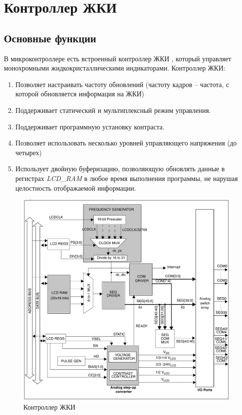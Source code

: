 \section{Контроллер ЖКИ}
\subsection{Основные функции}
В микроконтроллере есть встроенный контроллер ЖКИ \cite{datasheet}, который управляет монохромными жидкокристаллическими индикаторами. Контроллер ЖКИ:
\begin{enumerate}
\item Позволяет настраивать частоту обновлений (частоту кадров -- частота, с которой обновляется информация на ЖКИ)
\item Поддерживает статический и мультиплексный режим управления.
\item Поддерживает программную установку контраста.
\item Позволяет использовать несколько уровней управляющего напряжения (до четырех)
\item Использует двойную буферизацию, позволяющую обновлять данные в регистрах \textit{LCD\_RAM} в любое время выполнения программы, не нарушая целостность отображаемой информации.
\end{enumerate}

\begin{figure}[h!]
\begin{center}
\includegraphics[scale=0.25]{Image/24.jpg}
\end{center}
\caption{Контроллер ЖКИ}
\end{figure}

